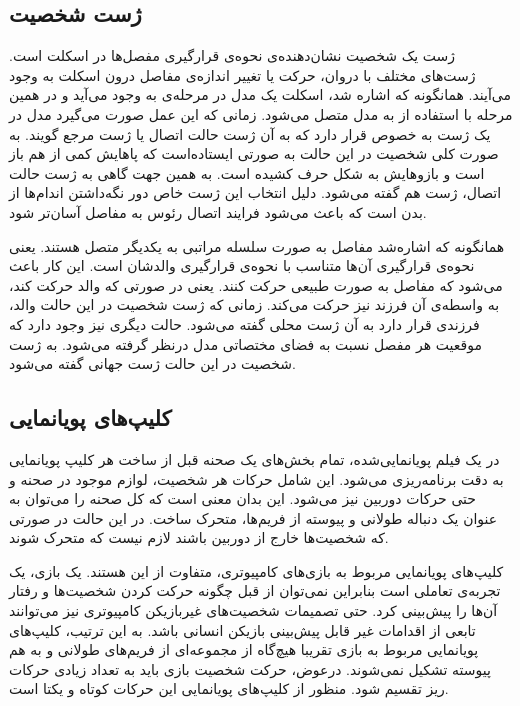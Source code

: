 \subsection{ژست شخصیت}

ژست یک شخصیت نشان‌دهنده‌ی نحوه‌ی قرارگیری مفصل‌ها در اسکلت است. ژست‌های مختلف با دروان، حرکت یا تغییر اندازه‌ی مفاصل درون اسکلت به وجود می‌‌آیند.
همانگونه که اشاره شد، اسکلت یک مدل در مرحله‌ی 
به وجود می‌‌آید و در همین مرحله با استفاده از 
 به مدل متصل می‌شود. زمانی که این عمل صورت می‌گیرد مدل در یک ژست به خصوص قرار دارد که به آن ژست حالت اتصال
یا
ژست مرجع
گویند.
به صورت کلی شخصیت در این حالت به صورتی ایستاده‌است که پاهایش کمی از هم باز است و 
بازو‌هایش به شکل حرف
کشیده است. به همین جهت گاهی به ژست حالت اتصال،
ژست
هم گفته می‌شود.
دلیل انتخاب این ژست خاص دور نگه‌داشتن اندام‌ها از بدن است که باعث می‌شود
فرایند اتصال رئوس به مفاصل آسان‌تر شود.

همانگونه که اشاره‌‌شد مفاصل به صورت سلسله مراتبی به یکدیگر متصل هستند. یعنی نحوه‌ی 
قرارگیری آن‌ها متناسب با نحوه‌ی قرارگیری والدشان است.
این کار باعث می‌شود که مفاصل به صورت طبیعی حرکت کنند. یعنی در صورتی که والد حرکت کند، به واسطه‌ی 
آن فرزند نیز حرکت می‌کند.
زمانی که ژست شخصیت در این حالت والد، فرزندی قرار دارد به آن ژست محلی
گفته می‌شود. حالت دیگری نیز وجود دارد که موقعیت هر مفصل نسبت به فضای مختصاتی مدل 
درنظر گرفته می‌شود. به ژست شخصیت در این حالت ژست جهانی
گفته می‌شود.

\subsection{‌کلیپ‌های پویانمایی}

در یک فیلم پویانمایی‌شده، تمام بخش‌های یک صحنه قبل از ساخت هر کلیپ پویانمایی به دقت برنامه‌ریزی می‌شود.
این شامل حرکات هر شخصیت، لوازم موجود در صحنه و حتی حرکات دوربین نیز می‌شود.
این بدان معنی است که کل صحنه را می‌توان به عنوان یک دنباله طولانی و پیوسته از فریم‌ها، متحرک ساخت.
در این حالت در صورتی که شخصیت‌ها خارج از دوربین باشند لازم نیست که متحرک شوند.

کلیپ‌های پویانمایی مربوط به بازی‌های کامپیوتری، متفاوت از این هستند. یک بازی، یک تجربه‌ی تعاملی است بنابراین نمی‌توان از قبل چگونه حرکت کردن شخصیت‌ها و رفتار آن‌ها را پیش‌بینی کرد.
حتی تصمیمات شخصیت‌های غیربازیکن کامپیوتری نیز می‌توانند تابعی از اقدامات غیر قابل پیش‌بینی بازیکن انسانی باشد.
به این ترتیب، کلیپ‌های پویانمایی مربوط به بازی تقریبا هیچ‌گاه از مجموعه‌ای از فریم‌های طولانی و به هم پیوسته تشکیل نمی‌شوند.
درعوض، حرکت شخصیت بازی باید به تعداد زیادی حرکات ریز تقسیم شود. 
منظور از کلیپ‌های پویانمایی این حرکات کوتاه و یکتا است.

